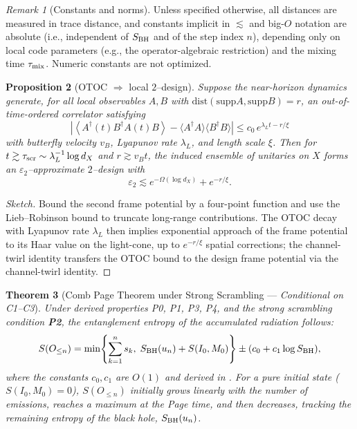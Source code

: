 \documentclass[11pt,a4paper]{article}
\newcommand{\Ptwo}{\textbf{P2}\xspace}
\theoremstyle{plain}
\newtheorem{theorem}{Theorem}
\newtheorem{proposition}[theorem]{Proposition}
\theoremstyle{definition}
\theoremstyle{remark}
\newtheorem{remark}[theorem]{Remark}
\begin{document}
\begin{remark}[Constants and norms]
Unless specified otherwise, all distances are measured in trace distance, and constants implicit in $\lesssim$
and big-$O$ notation are absolute (i.e., independent of $S_{\rm BH}$ and of the step index $n$), depending only
on local code parameters (e.g., the operator-algebraic restriction) and the mixing time $\tau_{\rm mix}$.
Numeric constants are not optimized.
\end{remark}

\begin{proposition}[OTOC $\Rightarrow$ local $2$--design]\label{prop:otoc-design}
Suppose the near-horizon dynamics generate, for all local observables $A,B$ with $\mathrm{dist}(\mathrm{supp}A,\mathrm{supp}B)=r$, an out-of-time-ordered correlator satisfying
\begin{equation}
\left|\left\langle A^\dagger(t) B^\dagger A(t) B \right\rangle - \langle A^\dagger A\rangle \langle B^\dagger B\rangle\right|
\le c_0\, e^{\lambda_L t - r/\xi}
\end{equation}
with butterfly velocity $v_B$, Lyapunov rate $\lambda_L$, and length scale $\xi$. Then for $t\gtrsim \tau_{\rm scr}\sim \lambda_L^{-1}\log d_X$ and $r\gtrsim v_B t$, the induced ensemble of unitaries on $X$ forms an $\varepsilon_2$--approximate $2$--design with
\begin{equation}
\varepsilon_2 \lesssim e^{-\Omega(\log d_X)} + e^{-r/\xi}.
\end{equation}
\end{proposition}
\begin{proof}[Sketch]
Bound the second frame potential by a four-point function and use the Lieb--Robinson bound to truncate long-range contributions. The OTOC decay with Lyapunov rate $\lambda_L$ then implies exponential approach of the frame potential to its Haar value on the light-cone, up to $e^{-r/\xi}$ spatial corrections; the channel-twirl identity transfers the OTOC bound to the design frame potential via the channel-twirl identity.
\end{proof}

\begin{theorem}[Comb Page Theorem under Strong Scrambling --- \emph{Conditional on C1--C3}]
\label{thm:comb-page}\label{thm:comb-page-strong}
Under derived properties P0, P1, P3, P4, and the strong scrambling condition \Ptwo, the entanglement entropy of the accumulated radiation follows:
\begin{equation}
\label{eq:comb-page}
S(O_{\le n}) = \min\!\left\{\sum_{k=1}^n s_k,\; S_{\rm BH}(u_n) + S(I_0, M_0)\right\} \pm (c_0 + c_1\log S_{\rm BH}),
\end{equation}
%
where the constants $c_0, c_1$ are $O(1)$ and derived in . For a pure initial state ($S(I_0, M_0)=0$), $S(O_{\le n})$ initially grows linearly with the number of emissions, reaches a maximum at the Page time, and then decreases, tracking the remaining entropy of the black hole, $S_{\rm BH}(u_n)$.
\end{theorem}
\end{document}
